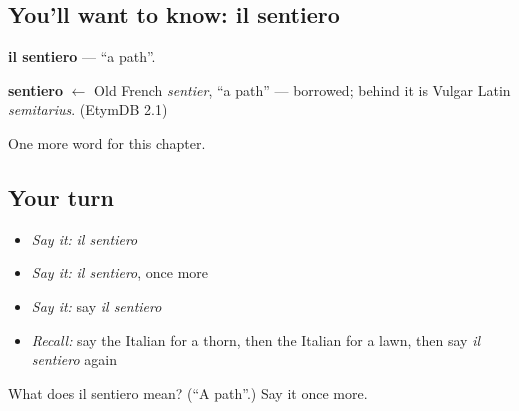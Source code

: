 \subsection*{You'll want to know: il sentiero}
\textbf{il sentiero} — \textquotedblleft{}a path\textquotedblright{}.

\begin{cousinweb}
\textbf{sentiero} $\leftarrow$ Old French \emph{sentier}, \textquotedblleft{}a path\textquotedblright{} — borrowed; behind it is Vulgar Latin \emph{semitarius}. (EtymDB 2.1)
\end{cousinweb}

\begin{grammarlens}[title={What you've built}]
One more word for this chapter.
\end{grammarlens}

\subsection*{Your turn}
\begin{itemize}
\raggedright
  \item \emph{Say it:} \emph{il sentiero}
  \item \emph{Say it:} \emph{il sentiero}, once more
  \item \emph{Say it:} say \emph{il sentiero}
  \item \emph{Recall:} say the Italian for a thorn, then the Italian for a lawn, then say \emph{il sentiero} again
\end{itemize}

\begin{tcolorbox}[breakable,colback=teal!4,colframe=teal!35!black,title={Before you move on}]
What does il sentiero mean? (\textquotedblleft{}A path\textquotedblright{}.) Say it once more.
\end{tcolorbox}
